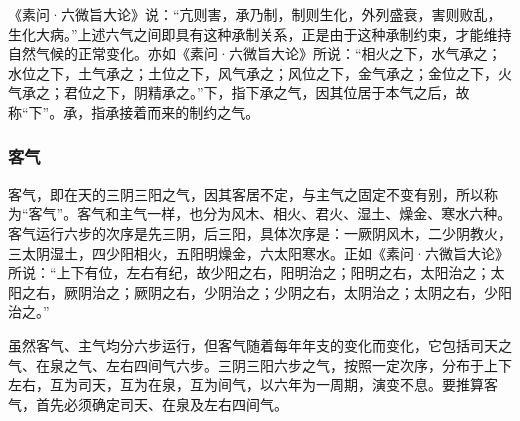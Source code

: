 \documentclass[12pt]{ctexbook}
\begin{document}
《素问·六微旨大论》说：“亢则害，承乃制，制则生化，外列盛衰，害则败乱，生化大病。”上述六气之间即具有这种承制关系，正是由于这种承制约束，才能维持自然气候的正常变化。亦如《素问·六微旨大论》所说：“相火之下，水气承之；水位之下，土气承之；土位之下，风气承之；风位之下，金气承之；金位之下，火气承之；君位之下，阴精承之。”下，指下承之气，因其位居于本气之后，故称“下”。承，指承接着而来的制约之气。

\subsubsection{客气}%

客气，即在天的三阴三阳之气，因其客居不定，与主气之固定不变有别，所以称为“客气”。客气和主气一样，也分为风木、相火、君火、湿土、燥金、寒水六种。客气运行六步的次序是先三阴，后三阳，具体次序是：一厥阴风木，二少阴教火，三太阴湿土，四少阳相火，五阳明燥金，六太阳寒水。正如《素问·六微旨大论》所说：“上下有位，左右有纪，故少阳之右，阳明治之；阳明之右，太阳治之；太阳之右，厥阴治之；厥阴之右，少阴治之；少阴之右，太阴治之；太阴之右，少阳治之。”

虽然客气、主气均分六步运行，但客气随着每年年支的变化而变化，它包括司天之气、在泉之气、左右四间气六步。三阴三阳六步之气，按照一定次序，分布于上下左右，互为司天，互为在泉，互为间气，以六年为一周期，演变不息。要推算客气，首先必须确定司天、在泉及左右四间气。
\end{document}
